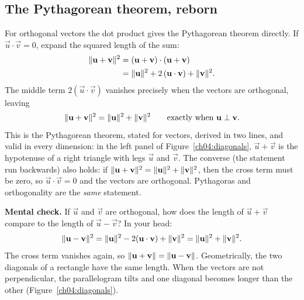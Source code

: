 \subsection{The Pythagorean theorem, reborn}

For orthogonal vectors the dot product gives the Pythagorean theorem directly. If
$\vec u\cdot\vec v = 0$, expand the squared length of the sum:
\begin{align*}
  \lVert\mathbf{u} + \mathbf{v}\rVert^2
    &= (\mathbf{u}+\mathbf{v})\cdot(\mathbf{u}+\mathbf{v}) \\
    &= \lVert\mathbf{u}\rVert^2 + 2\,(\mathbf{u}\cdot\mathbf{v}) + \lVert\mathbf{v}\rVert^2.
\end{align*}
The middle term $2(\vec u\cdot\vec v)$ vanishes precisely when the vectors are
orthogonal, leaving
\[
  \lVert\mathbf{u} + \mathbf{v}\rVert^2 = \lVert\mathbf{u}\rVert^2 + \lVert\mathbf{v}\rVert^2
  \qquad\text{exactly when } \mathbf{u}\perp\mathbf{v}.
\]
This is the Pythagorean theorem, stated for vectors, derived in two lines, and
valid in every dimension: in the left panel of Figure~\ref{ch04:diagonals},
$\vec u+\vec v$ is the hypotenuse of a right triangle with legs $\vec u$ and
$\vec v$. The converse (the statement run backwards) also holds: if
$\lVert\mathbf{u}+\mathbf{v}\rVert^2 = \lVert\mathbf{u}\rVert^2+\lVert\mathbf{v}\rVert^2$, then the cross term must
be zero, so $\vec u\cdot\vec v = 0$ and the vectors are orthogonal. Pythagoras and
orthogonality are the \emph{same} statement.

\textbf{Mental check.} If $\vec u$ and $\vec v$ are orthogonal, how does the length
of $\vec u+\vec v$ compare to the length of $\vec u-\vec v$? In your head:
\[
  \lVert\mathbf{u} - \mathbf{v}\rVert^2 = \lVert\mathbf{u}\rVert^2 - 2(\mathbf{u}\cdot\mathbf{v}) + \lVert\mathbf{v}\rVert^2
  = \lVert\mathbf{u}\rVert^2 + \lVert\mathbf{v}\rVert^2.
\]
The cross term vanishes again, so $\lVert\mathbf{u}+\mathbf{v}\rVert = \lVert\mathbf{u}-\mathbf{v}\rVert$.
Geometrically, the two diagonals of a rectangle have the same length. When the
vectors are not perpendicular, the parallelogram tilts and one diagonal becomes longer
than the other (Figure~\ref{ch04:diagonals}).

